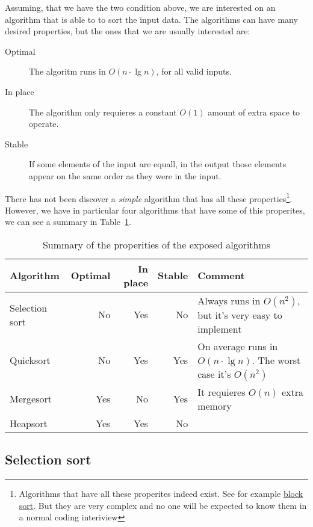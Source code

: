 Assuming, that we have the two condition above, we are interested on an algorithm that is able to to sort the input data. 
The algorithms can have many desired properties, but the ones that we are usually interested are:

\begin{description}
 \item[Optimal] The algoritm runs in $O(n \cdot \lg n)$, for all valid inputs.
 \item[In place] The algorithm only requieres a constant $O(1)$ amount of extra space to operate.
 \item[Stable] If some elements of the input are equall, in the output those elements appear on the same order as they were in the input.
\end{description}

There has not been discover a \emph{simple} algorithm that has all these properties\footnote{Algorithms that have all these properites indeed exist. See for example \href{https://en.wikipedia.org/wiki/Block_sort}{block sort}. But they are very complex and no one will be expected to know them in a normal coding interiview}.
However, we have in particular four algorithms that have some of this properites, we can see a summary in Table~\ref{tab:sorting}.

\begin{table}[htb]
  \begin{center}
    \begin{tabular}{l | r r r | l}
      Algorithm & Optimal & In place & Stable & Comment\\
      \midrule
      Selection sort & No & Yes & No & Always runs in $O(n^2)$, but it's very easy to implement\\
      Quicksort & No & Yes & Yes & On average runs in $O(n \cdot \lg n)$. The worst case it's $O(n^2)$ \\
      Mergesort & Yes & No & Yes & It requieres $O(n)$ extra memory\\
      Heapsort & Yes & Yes & No & \\
    \end{tabular}
  \end{center}
\caption{Summary of the properities of the exposed algorithms}
\label{tab:sorting}
\end{table}

\subsection{Selection sort}

